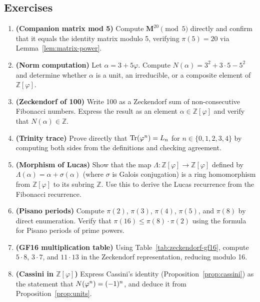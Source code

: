 \subsection{Exercises}\label{subsec:ch7-exercises-list}

\begin{enumerate}

\item \textbf{(Companion matrix mod 5)}  Compute \(\mathbf{M}^{20} \pmod 5\)
directly and confirm that it equals the identity matrix modulo 5,
verifying \(\pi(5) = 20\) via Lemma~\ref{lem:matrix-power}.

\item \textbf{(Norm computation)}  Let \(\alpha = 3 + 5\varphi\).  Compute
\(N(\alpha) = 3^2 + 3 \cdot 5 - 5^2\) and determine whether \(\alpha\) is a
unit, an irreducible, or a composite element of \(\mathbb{Z}[\varphi]\).

\item \textbf{(Zeckendorf of 100)}  Write 100 as a Zeckendorf sum of
non-consecutive Fibonacci numbers.  Express the result as an element
\(\alpha \in \mathbb{Z}[\varphi]\) and verify that \(N(\alpha) \in \mathbb{Z}\).

\item \textbf{(Trinity trace)}  Prove directly that
\(\mathrm{Tr}(\varphi^{n}) = L_n\) for \(n \in \{0,1,2,3,4\}\)
by computing both sides from the definitions and checking agreement.

\item \textbf{(Morphism of Lucas)}  Show that the map
\(\Lambda : \mathbb{Z}[\varphi] \to \mathbb{Z}[\varphi]\) defined by
\(\Lambda(\alpha) = \alpha + \sigma(\alpha)\) (where \(\sigma\) is Galois
conjugation) is a ring homomorphism from \(\mathbb{Z}[\varphi]\) to its
subring \(\mathbb{Z}\).  Use this to derive the Lucas recurrence from the
Fibonacci recurrence.

\item \textbf{(Pisano periods)}  Compute \(\pi(2)\), \(\pi(3)\), \(\pi(4)\),
\(\pi(5)\), and \(\pi(8)\) by direct enumeration.  Verify that
\(\pi(16) \leq \pi(8) \cdot \pi(2)\) using the formula for Pisano periods
of prime powers.

\item \textbf{(GF16 multiplication table)}  Using Table~\ref{tab:zeckendorf-gf16},
compute \(5 \cdot 8\), \(3 \cdot 7\), and \(11 \cdot 13\) in the
Zeckendorf representation, reducing modulo 16.

\item \textbf{(Cassini in \(\mathbb{Z}[\varphi]\))}  Express Cassini's identity
(Proposition~\ref{prop:cassini}) as the statement that
\(N(\varphi^{n}) = (-1)^n\), and deduce it from
Proposition~\ref{prop:units}.


\end{enumerate}
